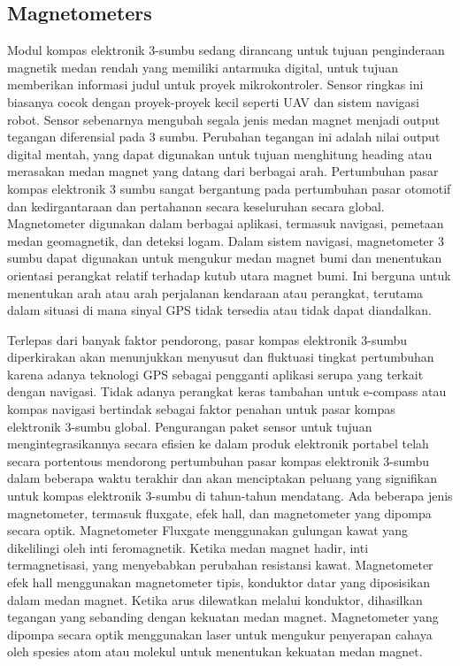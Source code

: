 \subsection{Magnetometers}

Modul kompas elektronik 3-sumbu sedang dirancang untuk tujuan penginderaan magnetik medan rendah yang memiliki antarmuka digital, untuk tujuan memberikan informasi judul untuk proyek 
mikrokontroler. Sensor ringkas ini biasanya cocok dengan proyek-proyek kecil seperti UAV dan sistem navigasi robot. Sensor sebenarnya mengubah segala jenis medan magnet menjadi output 
tegangan diferensial pada 3 sumbu. Perubahan tegangan ini adalah nilai output digital mentah, yang dapat digunakan untuk tujuan menghitung heading atau merasakan medan magnet yang datang 
dari berbagai arah. Pertumbuhan pasar kompas elektronik 3 sumbu sangat bergantung pada pertumbuhan pasar otomotif dan kedirgantaraan dan pertahanan secara keseluruhan secara global. 
Magnetometer digunakan dalam berbagai aplikasi, termasuk navigasi, pemetaan medan geomagnetik, dan deteksi logam. Dalam sistem navigasi, magnetometer 3 sumbu dapat digunakan untuk 
mengukur medan magnet bumi dan menentukan orientasi perangkat relatif terhadap kutub utara magnet bumi. Ini berguna untuk menentukan arah atau arah perjalanan kendaraan atau perangkat, 
terutama dalam situasi di mana sinyal GPS tidak tersedia atau tidak dapat diandalkan.

Terlepas dari banyak faktor pendorong, pasar kompas elektronik 3-sumbu diperkirakan akan menunjukkan menyusut dan fluktuasi tingkat pertumbuhan karena adanya teknologi GPS sebagai 
pengganti aplikasi serupa yang terkait dengan navigasi. Tidak adanya perangkat keras tambahan untuk e-compass atau kompas navigasi bertindak sebagai faktor penahan untuk pasar kompas 
elektronik 3-sumbu global. Pengurangan paket sensor untuk tujuan mengintegrasikannya secara efisien ke dalam produk elektronik portabel telah secara portentous mendorong pertumbuhan 
pasar kompas elektronik 3-sumbu dalam beberapa waktu terakhir dan akan menciptakan peluang yang signifikan untuk kompas elektronik 3-sumbu di tahun-tahun mendatang. Ada beberapa jenis 
magnetometer, termasuk fluxgate, efek hall, dan magnetometer yang dipompa secara optik. Magnetometer Fluxgate menggunakan gulungan kawat yang dikelilingi oleh inti feromagnetik. Ketika 
medan magnet hadir, inti termagnetisasi, yang menyebabkan perubahan resistansi kawat. Magnetometer efek hall menggunakan magnetometer tipis, konduktor datar yang diposisikan dalam medan 
magnet. Ketika arus dilewatkan melalui konduktor, dihasilkan tegangan yang sebanding dengan kekuatan medan magnet. Magnetometer yang dipompa secara optik menggunakan laser untuk mengukur 
penyerapan cahaya oleh spesies atom atau molekul untuk menentukan kekuatan medan magnet.

